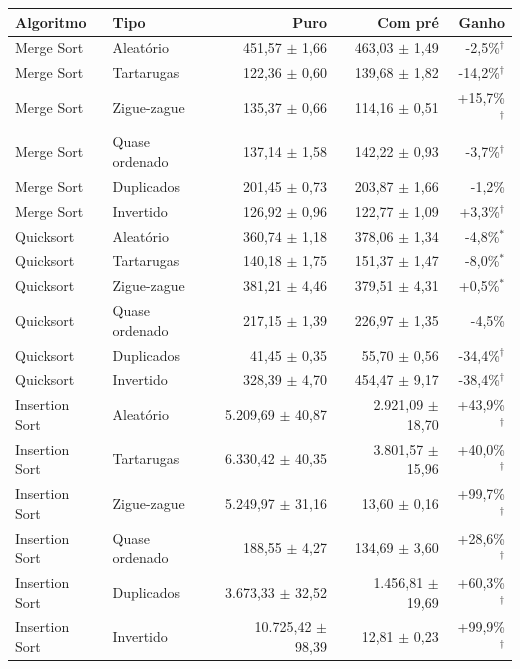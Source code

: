 \footnotesize
\begin{tabular}{llrrr}
\hline
\textbf{Algoritmo} & \textbf{Tipo} & \textbf{Puro} & \textbf{Com pré} & \textbf{Ganho} \\
\hline
Merge Sort & Aleatório & 451{,}57 $\pm$ 1{,}66 & 463{,}03 $\pm$ 1{,}49 & -2{,}5\%$^{\dagger}$ \\
Merge Sort & Tartarugas & 122{,}36 $\pm$ 0{,}60 & 139{,}68 $\pm$ 1{,}82 & -14{,}2\%$^{\dagger}$ \\
Merge Sort & Zigue-zague & 135{,}37 $\pm$ 0{,}66 & 114{,}16 $\pm$ 0{,}51 & +15{,}7\%$^{\dagger}$ \\
Merge Sort & Quase ordenado & 137{,}14 $\pm$ 1{,}58 & 142{,}22 $\pm$ 0{,}93 & -3{,}7\%$^{\dagger}$ \\
Merge Sort & Duplicados & 201{,}45 $\pm$ 0{,}73 & 203{,}87 $\pm$ 1{,}66 & -1{,}2\% \\
Merge Sort & Invertido & 126{,}92 $\pm$ 0{,}96 & 122{,}77 $\pm$ 1{,}09 & +3{,}3\%$^{\dagger}$ \\
Quicksort & Aleatório & 360{,}74 $\pm$ 1{,}18 & 378{,}06 $\pm$ 1{,}34 & -4{,}8\%$^{*}$ \\
Quicksort & Tartarugas & 140{,}18 $\pm$ 1{,}75 & 151{,}37 $\pm$ 1{,}47 & -8{,}0\%$^{*}$ \\
Quicksort & Zigue-zague & 381{,}21 $\pm$ 4{,}46 & 379{,}51 $\pm$ 4{,}31 & +0{,}5\%$^{*}$ \\
Quicksort & Quase ordenado & 217{,}15 $\pm$ 1{,}39 & 226{,}97 $\pm$ 1{,}35 & -4{,}5\% \\
Quicksort & Duplicados & 41{,}45 $\pm$ 0{,}35 & 55{,}70 $\pm$ 0{,}56 & -34{,}4\%$^{\dagger}$ \\
Quicksort & Invertido & 328{,}39 $\pm$ 4{,}70 & 454{,}47 $\pm$ 9{,}17 & -38{,}4\%$^{\dagger}$ \\
Insertion Sort & Aleatório & 5.209{,}69 $\pm$ 40{,}87 & 2.921{,}09 $\pm$ 18{,}70 & +43{,}9\%$^{\dagger}$ \\
Insertion Sort & Tartarugas & 6.330{,}42 $\pm$ 40{,}35 & 3.801{,}57 $\pm$ 15{,}96 & +40{,}0\%$^{\dagger}$ \\
Insertion Sort & Zigue-zague & 5.249{,}97 $\pm$ 31{,}16 & 13{,}60 $\pm$ 0{,}16 & +99{,}7\%$^{\dagger}$ \\
Insertion Sort & Quase ordenado & 188{,}55 $\pm$ 4{,}27 & 134{,}69 $\pm$ 3{,}60 & +28{,}6\%$^{\dagger}$ \\
Insertion Sort & Duplicados & 3.673{,}33 $\pm$ 32{,}52 & 1.456{,}81 $\pm$ 19{,}69 & +60{,}3\%$^{\dagger}$ \\
Insertion Sort & Invertido & 10.725{,}42 $\pm$ 98{,}39 & 12{,}81 $\pm$ 0{,}23 & +99{,}9\%$^{\dagger}$ \\

\end{tabular}
